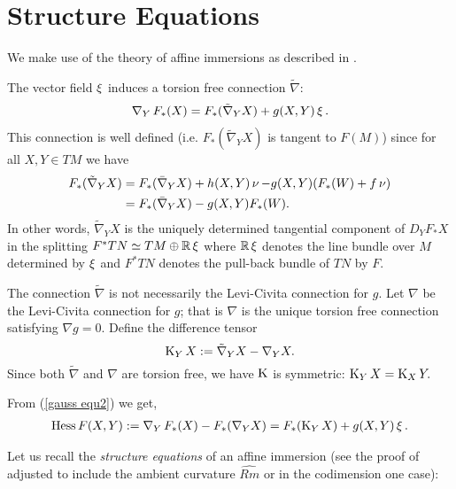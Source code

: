 \documentclass{amsart}
\begin{document}



\section{Structure Equations}

We make use of the theory of affine immersions as described in \cite{MR1311248}.

The vector field $\operatorname{\xi}$ induces a torsion free connection $\tilde{\nabla}$:
\begin{align}\label{gauss equ2}
\operatorname{\nabla}_YF_{\ast}(X)=F_{\ast}(\tilde{\nabla}_YX)+g(X,Y)\operatorname{\xi}.
\end{align}
This connection is well defined (i.e. $F_{\ast}(\tilde{\nabla}_Y X)$ is tangent to $F(M)$) since for all $X,Y\in TM$ we have
\begin{align}
F_{\ast}(\tilde{\nabla}_Y X) &= F_{\ast}(\bar{\nabla}_Y X) + h(X, Y) \operatorname{\nu} - g(X, Y) (F_{\ast}(W) + f \operatorname{\nu}) \\
&= F_{\ast}(\bar{\nabla}_YX)-g(X,Y)F_{\ast}(W) \nonumber.
\end{align}
In other words, $\tilde{\nabla}_Y X$ is the uniquely determined tangential component of $D_Y F_{\ast} X$ in the splitting $F^{\ast} TN \simeq TM \oplus \mathbb{R} \operatorname{\xi}$ where $\mathbb{R}\operatorname{\xi}$ denotes the line bundle over $M$ determined by $\operatorname{\xi}$ and $F^{\ast} TN$ denotes the pull-back bundle of $TN$ by $F$.

The connection $\tilde{\nabla}$ is not necessarily the Levi-Civita connection for $g$. Let $\nabla$ be the Levi-Civita connection for $g$; that is $\nabla$ is the unique torsion free connection satisfying $\nabla g=0.$ Define the difference tensor
\begin{equation}
\label{eq:difftensor}
\operatorname{K}_YX := \tilde{\nabla}_{Y}X - \nabla_{Y}X.
\end{equation}
Since both $\tilde{\nabla}$ and $\nabla$ are torsion free, we have $\operatorname{K}$ is symmetric: $\operatorname{K}_YX = \operatorname{K}_XY.$

From (\ref{gauss equ2}) we get,
\begin{align}\label{gauss equ3}
\operatorname{Hess} F(X,Y):=\operatorname{\nabla}_YF_{\ast}(X)-F_{\ast}(\nabla_YX) = F_{\ast}(\operatorname{K}_YX) + g(X,Y)\operatorname{\xi}.
\end{align}

Let us recall the \emph{structure equations} of an affine immersion (see the proof of \cite[Section II, Theorem 2.1]{MR1311248} adjusted to include the ambient curvature $\widehat{Rm}$ or \cite[p. 197 equations (N1.6)--(N1.9)]{MR1311248} in the codimension one case):
\end{document}

